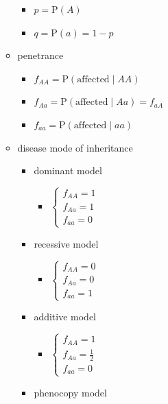 \documentclass[
]{book}
\providecommand{\tightlist}{%
  \setlength{\itemsep}{0pt}\setlength{\parskip}{0pt}}
\theoremstyle{definition}
\theoremstyle{definition}
\theoremstyle{definition}
\theoremstyle{definition}
\theoremstyle{remark}
\begin{document}
\begin{itemize}
\begin{itemize}
    \begin{itemize}
    \tightlist
    \item
      \(p = \mathrm{P}\left(A\right)\)
    \item
      \(q = \mathrm{P}\left(a\right) = 1-p\)
    \end{itemize}
  \item
    penetrance

    \begin{itemize}
    \tightlist
    \item
      \(f_{AA} = \mathrm{P}\left(\text{affected}\mid AA\right)\)
    \item
      \(f_{Aa} = \mathrm{P}\left(\text{affected}\mid Aa\right) = f_{aA}\)
    \item
      \(f_{aa} = \mathrm{P}\left(\text{affected}\mid aa\right)\)
    \end{itemize}
  \item
    disease mode of inheritance

    \begin{itemize}
    \tightlist
    \item
      dominant model

      \begin{itemize}
      \tightlist
      \item
        \(\begin{cases}f_{AA} = 1 \\ f_{Aa} = 1 \\ f_{aa} = 0\end{cases}\)
      \end{itemize}
    \item
      recessive model

      \begin{itemize}
      \tightlist
      \item
        \(\begin{cases}f_{AA} = 0 \\ f_{Aa} = 0 \\ f_{aa} = 1\end{cases}\)
      \end{itemize}
    \item
      additive model

      \begin{itemize}
      \tightlist
      \item
        \(\begin{cases}f_{AA} = 1 \\ f_{Aa} = \frac{1}{2} \\ f_{aa} = 0\end{cases}\)
      \end{itemize}
    \item
      phenocopy model


\end{itemize}
\end{itemize}
\end{itemize}
\end{document}
